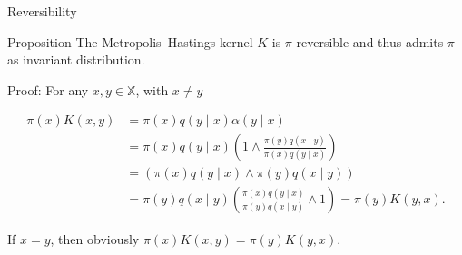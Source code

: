 \begin{frame}{Reversibility}
	\begin{block}{Proposition}
		The Metropolis--Hastings kernel $K$ is $\pi$-reversible and thus admits $\pi$ as invariant distribution.
	\end{block}

	Proof:
	For any $x, y \in \mathbb{X}$, with $x \neq y$

	\begin{align*}
		\pi(x)K(x, y) & = \pi(x)q(y \mid x)\alpha(y \mid x)                                                                    \\
		              & = \pi(x)q(y \mid x) \left(1 \wedge \frac{\pi(y)q(x \mid y)}{\pi(x)q(y \mid x)}\right)                  \\
		              & = \left(\pi(x)q(y \mid x) \wedge \pi(y)q(x \mid y)\right)                                              \\
		              & = \pi(y)q(x \mid y) \left(\frac{\pi(x)q(y \mid x)}{\pi(y)q(x \mid y)} \wedge 1\right) = \pi(y)K(y, x).
	\end{align*}

	If $x = y$, then obviously $\pi(x)K(x, y) = \pi(y)K(y, x)$.

\end{frame}

% 


